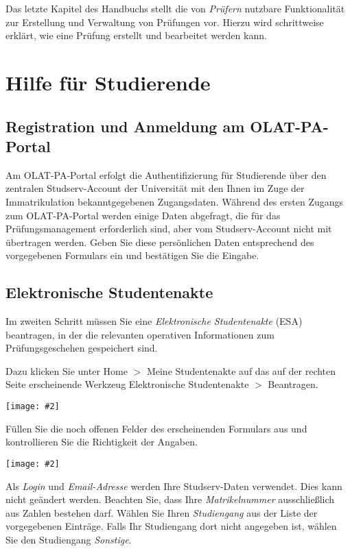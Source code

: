 \documentclass[a4paper,11pt]{article}
\newcommand{\bild}[2]{
    \begin{center}\texttt{[image: \#2]}\end{center}
}
\newcommand{\knopf}[1]{{\sc #1}}
\begin{document}
Das letzte Kapitel des Handbuchs stellt die von {\em Prüfern}
nutzbare Funktionalität zur Erstellung und Verwaltung von Prüfungen vor.
Hierzu wird schrittweise erklärt, wie eine Prüfung erstellt und bearbeitet
werden kann.

\clearpage
\section{Hilfe für Studierende}

\subsection{Registration und Anmeldung am OLAT-PA-Portal}

Am OLAT-PA-Portal erfolgt die Authentifizierung für Studierende über den
zentralen Studserv-Account der Universität mit den Ihnen im Zuge der
Immatrikulation bekanntgegebenen Zugangsdaten.  Während des ersten Zugangs zum
OLAT-PA-Portal werden einige Daten abgefragt, die für das Prüfungsmanagement
erforderlich sind, aber vom Studserv-Account nicht mit übertragen werden.
Geben Sie diese persönlichen Daten entsprechend des vorgegebenen Formulars ein
und bestätigen Sie die Eingabe.

\subsection{Elektronische Studentenakte}

Im zweiten Schritt müssen Sie eine {\em Elektronische Studentenakte} (ESA)
beantragen, in der die relevanten operativen Informationen zum
Prüfungsgeschehen gespeichert sind. 

Dazu klicken Sie unter \knopf{Home $>$ Meine Studentenakte} auf das auf der
rechten Seite erscheinende Werkzeug \knopf{Elektronische Studentenakte $>$
  Beantragen}.

\bild{.95}{ESA-Beantragen}

Füllen Sie die noch offenen Felder des erscheinenden Formulars aus und
kontrollieren Sie die Richtigkeit der Angaben.

\bild{.7}{ESA-Eingaben}

Als {\em Login} und {\em Email-Adresse} werden Ihre Studserv-Daten verwendet.
Dies kann nicht geändert werden.  Beachten Sie, dass Ihre {\em Matrikelnummer}
ausschließlich aus Zahlen bestehen darf.  Wählen Sie Ihren {\em Studiengang}
aus der Liste der vorgegebenen Einträge.  Falls Ihr Studiengang dort nicht
angegeben ist, wählen Sie den Studiengang {\em Sonstige}.
\end{document}
